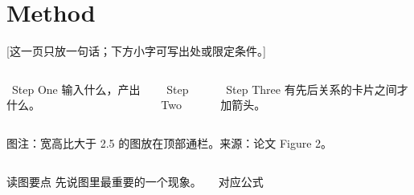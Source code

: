 \documentclass[aspectratio=169,10pt,t]{beamer}
\begin{document}
\section{Method}
\begin{frame}
  [这一页只放一句话；下方小字可写出处或限定条件。]
\end{frame}

\begin{frame}
  \begin{columns}[T,onlytextwidth]
      \begin{warmcard}[\linewidth][2.3cm]{\ Step One}
        输入什么，产出什么。
      \end{warmcard}
    \gaparrow
      \begin{warmcard}[\linewidth][2.3cm]{\ Step Two}
      \end{warmcard}
    \gaparrow
      \begin{warmcard}[\linewidth][2.3cm]{\ Step Three}
        有先后关系的卡片之间才加箭头。
      \end{warmcard}
  \end{columns}
  \vspace{4pt}
\end{frame}

\begin{frame}
    {图注：宽高比大于 2.5 的图放在顶部通栏。来源：论文 Figure 2。}
  \begin{columns}[T,onlytextwidth]
      \begin{callout}[\linewidth][1.3cm]{读图要点}
        先说图里最重要的一个现象。
      \end{callout}
      \begin{warmcard}[\linewidth][1.3cm]{对应公式}
      \end{warmcard}
  \end{columns}
\end{frame}
\end{document}
